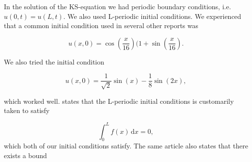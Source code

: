 In the solution of the KS-equation we had periodic boundary conditions, i.e. $u(0,t) = u(L,t)$. We also used L-periodic initial conditions. We experienced that a common initial condition used in several other reports was

\begin{equation*}
u(x,0) = \cos(\frac{x}{16})(1 + \sin(\frac{x}{16}).
\end{equation*}

We also tried the initial condition

\begin{equation*}
u(x,0) = \frac{1}{\sqrt{2}} \sin(x) - \frac{1}{8}\sin(2x),
\end{equation*}

which worked well. \cite{periodicInitial} states that the L-periodic initial conditions is customarily taken to satisfy

\begin{equation}
\int_0^L\! f(x)\,\textrm{d}x = 0,
\end{equation}
which both of our initial conditions satisfy. The same article also states that there exists a bound
